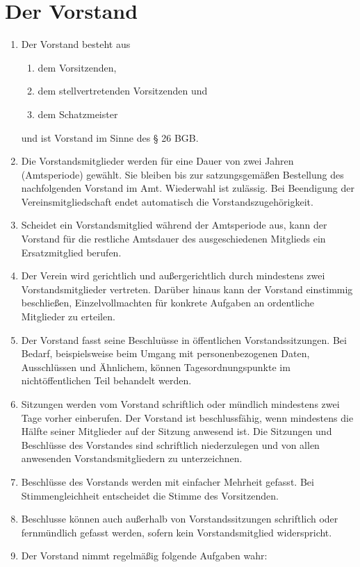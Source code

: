 \documentclass[12pt,a4paper,titlepage]{scrartcl}
\begin{document}
\section{Der Vorstand}
\begin{enumerate}
\item
Der Vorstand besteht aus
\begin{enumerate}
\item dem Vorsitzenden,
\item dem stellvertretenden Vorsitzenden und
\item dem Schatzmeister
\end{enumerate}
und ist Vorstand im Sinne des § 26 BGB.
\item  Die Vorstandsmitglieder werden für eine Dauer von zwei Jahren (Amtsperiode) gewählt.
Sie bleiben bis zur satzungsgemäßen Bestellung des nachfolgenden Vorstand im Amt. Wiederwahl ist zulässig. Bei Beendigung der Vereinsmitgliedschaft endet automatisch die Vorstandszugehörigkeit.
\item Scheidet ein Vorstandsmitglied während der Amtsperiode aus, kann der Vorstand für
die restliche Amtsdauer des ausgeschiedenen Mitglieds ein Ersatzmitglied berufen.
\item  Der Verein wird gerichtlich und außergerichtlich durch mindestens zwei Vorstandsmitglieder vertreten. Darüber hinaus kann der Vorstand einstimmig beschließen, Einzelvollmachten für konkrete Aufgaben an ordentliche Mitglieder zu erteilen.
\item Der Vorstand fasst seine Beschluüsse in öffentlichen Vorstandssitzungen. Bei Bedarf,
beispielsweise beim Umgang mit personenbezogenen Daten, Ausschlüssen und Ähnlichem,
können Tagesordnungspunkte im nichtöffentlichen Teil behandelt werden. 
\item Sitzungen werden vom Vorstand schriftlich oder mündlich mindestens zwei Tage vorher einberufen. Der Vorstand ist beschlussfähig, wenn mindestens die Hälfte seiner Mitglieder auf der Sitzung anwesend ist. Die Sitzungen und Beschlüsse des Vorstandes sind schriftlich niederzulegen und von allen anwesenden Vorstandsmitgliedern zu unterzeichnen.
\item Beschlüsse des Vorstands werden mit einfacher Mehrheit gefasst. Bei Stimmengleichheit entscheidet die Stimme des Vorsitzenden.
\item Beschlusse können auch außerhalb von Vorstandssitzungen schriftlich oder fernmündlich
gefasst werden, sofern kein Vorstandsmitglied widerspricht.
\item Der Vorstand nimmt regelmäßig folgende Aufgaben wahr:

\end{enumerate}
\end{document}
